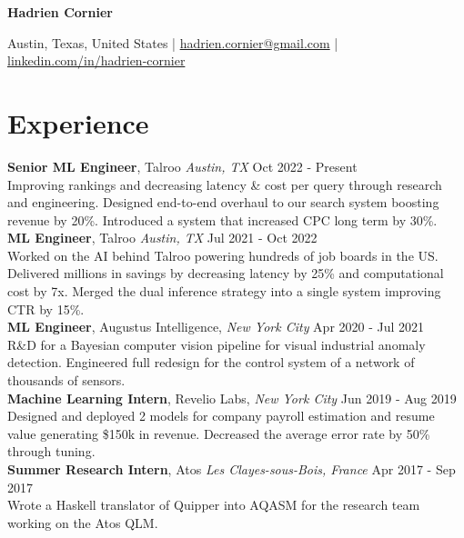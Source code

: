 \documentclass[a4paper,10pt]{article}
\begin{document}
    \pagestyle{empty}

    \centerline{\huge \textbf{Hadrien Cornier}}
    \vspace{2mm}
    \centerline{Austin, Texas, United States | \href{mailto:hadrien.cornier@gmail.com}{hadrien.cornier@gmail.com} | \href{https://linkedin.com/in/hadrien-cornier}{linkedin.com/in/hadrien-cornier}}

    \section*{Experience}
    \noindent\textbf{Senior ML Engineer}, Talroo  \textit{Austin, TX} \hfill Oct 2022 - Present\\
    Improving rankings and decreasing latency \& cost per query through research and engineering. Designed end-to-end overhaul to our search system boosting revenue by 20\%. Introduced a system that increased CPC long term by 30\%.\\

    \noindent\textbf{ML Engineer}, Talroo \textit{Austin, TX} \hfill Jul 2021 - Oct 2022\\
    Worked on the AI behind Talroo powering hundreds of job boards in the US. Delivered millions in savings by decreasing latency by 25\% and computational cost by 7x. Merged the dual inference strategy into a single system improving CTR by 15\%.\\

    \noindent\textbf{ML Engineer}, Augustus Intelligence, \textit{New York City} \hfill Apr 2020 - Jul 2021\\
    R\&D for a Bayesian computer vision pipeline for visual industrial anomaly detection. Engineered full redesign for the control system of a network of thousands of sensors.\\

    \noindent\textbf{Machine Learning Intern}, Revelio Labs, \textit{New York City} \hfill Jun 2019 - Aug 2019\\
    Designed and deployed 2 models for company payroll estimation and resume value generating \$150k in revenue. Decreased the average error rate by 50\% through tuning.\\

    \noindent\textbf{Summer Research Intern}, Atos \textit{Les Clayes-sous-Bois, France} \hfill Apr 2017 - Sep 2017\\
    Wrote a Haskell translator of Quipper into AQASM for the research team working on the Atos QLM.\\
\end{document}
